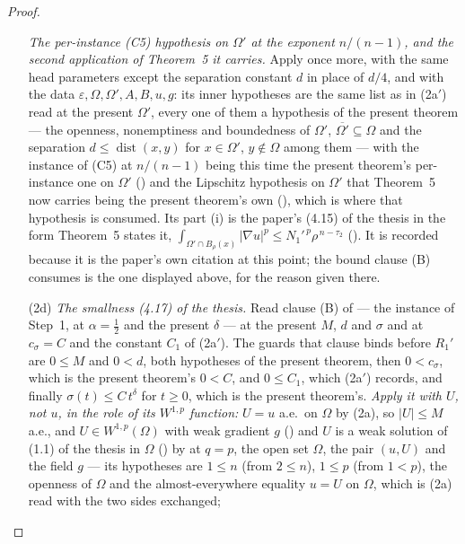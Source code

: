 \begin{proof}
\begin{enumerate}
  \emph{The per-instance \textup{(C5)} hypothesis on $\Omega'$ at the exponent
  $n/(n-1)$, and the second application of Theorem~5 it carries.}  Apply
   once more, with the same head parameters
  except the separation constant $d$ in place of $d/4$, and with the data
  $\varepsilon,\Omega,\Omega',A,B,u,g$: its inner hypotheses are the same list
  as in (2a$'$) read at the present $\Omega'$, every one of them a hypothesis of
  the present theorem --- the openness, nonemptiness and boundedness of
  $\Omega'$, $\overline{\Omega'}\subseteq\Omega$ and the separation
  $d\le\operatorname{dist}(x,y)$ for $x\in\Omega'$, $y\notin\Omega$ among them
  --- with the instance of (C5) at $n/(n-1)$ being this time the present
  theorem's per-instance one on $\Omega'$ () and
  the Lipschitz hypothesis on $\Omega'$ that Theorem~5 now carries being the
  present theorem's own (),
  which is where that hypothesis is consumed.  Its part (i) is the paper's
  (4.15) of the thesis in the form Theorem~5 states it,
  $\int_{\Omega'\cap B_\rho(x)}|\nabla u|^p\le N_1'^{\,p}\rho^{\,n-\tau_2}$
  ().  It is recorded because it is the paper's own
  citation at this point; the bound clause (B) consumes is the one displayed
  above, for the reason given there.
\item[(2d)] \emph{The smallness (4.17) of the thesis.}  Read clause (B) of
   --- the instance of Step~1, at
  $\alpha=\tfrac12$ and the present $\delta$ --- at the present $M$, $d$ and
  $\sigma$ and at $c_\sigma=C$ and the constant $C_1$ of (2a$'$).  The guards
  that clause binds before $R_1'$ are $0\le M$ and $0<d$, both hypotheses of the
  present theorem, then $0<c_\sigma$, which is the present theorem's $0<C$, and
  $0\le C_1$, which (2a$'$) records, and finally
  $\sigma(t)\le C\,t^{\delta}$ for $t\ge0$, which is the present theorem's.
  \emph{Apply it with $U$, not $u$, in the role of its $W^{1,p}$ function:}
  $U=u$ a.e.\ on $\Omega$ by (2a), so $|U|\le M$ a.e., and
  $U\in W^{1,p}(\Omega)$ with weak gradient $g$ () and $U$ is
  a weak solution of (1.1) of the thesis in $\Omega$ () by
   at $q=p$, the open set $\Omega$, the pair
  $(u,U)$ and the field $g$ --- its hypotheses are $1\le n$ (from $2\le n$),
  $1\le p$ (from $1<p$), the openness of $\Omega$ and the almost-everywhere
  equality $u=U$ on $\Omega$, which is (2a) read with the two sides exchanged;

\end{enumerate}
\end{proof}

